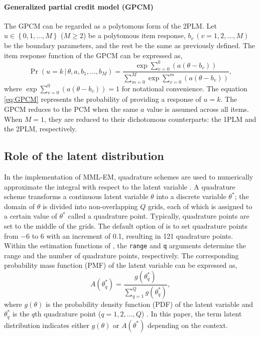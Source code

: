 \hypertarget{generalized-partial-credit-model-gpcm}{%
\paragraph{Generalized partial credit model (GPCM)}\label{generalized-partial-credit-model-gpcm}}

The GPCM can be regarded as a polytomous form of the 2PLM. Let
\(u \in \left\{0, 1, \dots, M\right\}\) (\(M \ge 2\)) be a polytomous item
response, \(b_v \, (v = 1, 2, \dots, M)\) be the boundary parameters, and
the rest be the same as previously defined. The item response function
of the GPCM can be expressed as,
\begin{equation}
\Pr( u = k \, | \, \theta, a, b_1, \dots , b_M)  =
\frac{ \exp{ \sum_{v = 0}^{k}{\left(a (\theta - b_v) \right)}} }
{ \sum_{m = 0}^{M}{\exp{ \sum_{v = 0}^{m}{\left(a (\theta - b_v) \right)}} }},
\label{eq:GPCM}
\end{equation}
where \(\exp{ \sum_{v = 0}^{0}{\left(a (\theta - b_v) \right)}} = 1\)
for notational convenience. The equation \eqref{eq:GPCM} represents the
probability of providing a response of \(u = k\). The GPCM reduces to the
PCM when the same \(a\) value is assumed across all items.
When \(M = 1\), they are reduced to their
dichotomous counterparts: the 1PLM and the 2PLM, respectively.

\hypertarget{role-of-latent-distribution}{%
\subsection{Role of the latent distribution}\label{role-of-latent-distribution}}

In the implementation of MML-EM, quadrature schemes are used to
numerically approximate the integral with respect to the latent variable
\citep{Baker+Kim:2004, Bock+Aitkin:1981}. A quadrature scheme transforms a
continuous latent variable \(\theta\) into a discrete variable
\(\theta^{*}\); the domain of \(\theta\) is divided into non-overlapping \(Q\)
grids, each of which is assigned to a certain value of \(\theta^{*}\) called a
quadrature point. Typically, quadrature points are set to the
middle of the grids. The default option of  is to set
quadrature points from \(-6\) to \(6\) with an increment of 0.1, resulting in
121 quadrature points. Within the estimation functions of ,
the \texttt{range} and \texttt{q} arguments determine the range and the number of quadrature
points, respectively. The corresponding probability mass
function (PMF) of the latent variable can be expressed as,
\begin{equation}
A \left( \theta^{*}_{q} \right) =
\frac{ g \left( \theta^{*}_{q} \right) }
{ \sum_{ q = 1 }^{Q}{g \left( \theta^{*}_{q} \right)} },
\label{eq:quadrature}
\end{equation}
where \(g{ \left( \theta \right)}\) is the probability density function
(PDF) of the latent variable and \(\theta^{*}_{q}\) is the \(q\)th
quadrature point (\(q = 1, 2, \dots, Q\)) \citep{Baker+Kim:2004}. In this
paper, the term latent distribution indicates either \(g{ \left( \theta \right)}\)
or \(A{ \left( \theta^{*} \right)}\) depending on the context.


